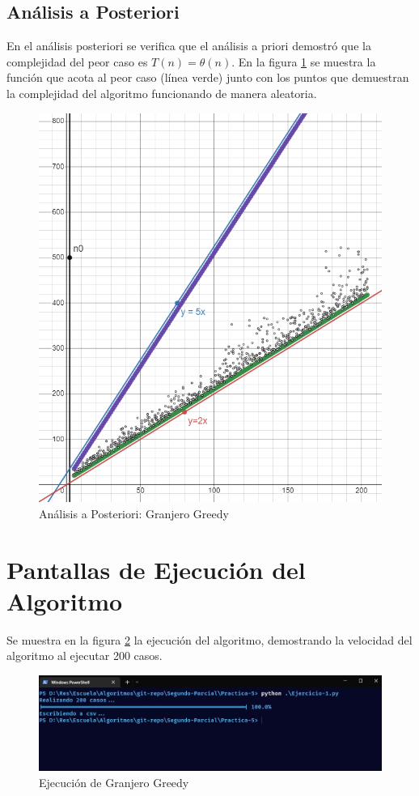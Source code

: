     \subsection{Análisis a Posteriori}
        En el análisis posteriori se verifica que el análisis a priori demostró que la complejidad del peor caso es \(T(n) = \theta(n)\). En la figura \ref{fig:posteriori1} se muestra la función que acota al peor caso (línea verde) junto con los puntos que demuestran la complejidad del algoritmo funcionando de manera aleatoria.
        \begin{figure}[htp!]
            \centering
            \includegraphics[width=1 \textwidth]{Images/A_Posteriori/posteriori.png}  
            \caption{Análisis a Posteriori: Granjero Greedy}
            \label{fig:posteriori1}
        \end{figure}
    
    
    
    \newpage
    \section{Pantallas de Ejecución del Algoritmo}
    Se muestra en la figura \ref{fig:terminal} la ejecución del algoritmo, demostrando la velocidad del algoritmo al ejecutar 200 casos.
    
        \begin{figure}[htp!]
            \centering
            \includegraphics[width=0.8 \textwidth]{Images/Pantallas/terminal.png}  
            \caption{Ejecución de Granjero Greedy}
            \label{fig:terminal}
        \end{figure}
    